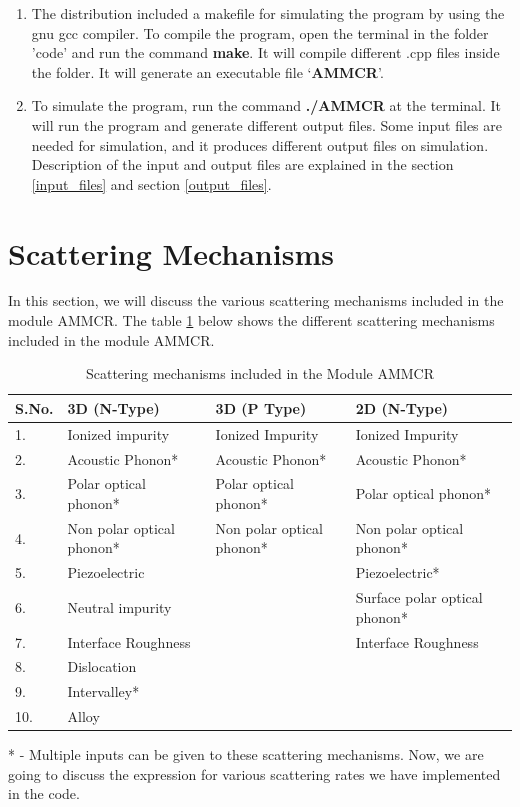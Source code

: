 \documentclass[12pt]{article}
\begin{document}
\begin{enumerate}
\item The distribution included a makefile for simulating the program by using the gnu gcc compiler.  To compile the program, open the terminal in the folder 'code' and run the command \textbf{make}. It will compile different .cpp files inside the folder. It will generate an executable file \lq \textbf{AMMCR}\rq .

\item To simulate the program, run the command \textbf{./AMMCR} at the terminal. It will run the program and generate different output files. Some input files are needed for simulation, and it produces different output files on simulation. Description of the input and output files are explained in the section \ref{input_files} and section \ref{output_files}. 

\end{enumerate} 


\section{Scattering Mechanisms} \label{scattering}
In this section, we will discuss the various scattering mechanisms included in the module AMMCR. 
The table \ref{scattering} below shows the different scattering mechanisms included in the module AMMCR.

\begin{table} [H]
\caption{ Scattering mechanisms included in the Module AMMCR}
\label{scattering_table}
\begin{tabular}{|l|l|l|l|}
\hline
S.No. & 3D (N-Type) & 3D (P Type) & 2D (N-Type)   \\
\hline                                      
1. & Ionized impurity   &  Ionized Impurity & Ionized Impurity \\
\hline
2. & Acoustic Phonon*   &  Acoustic Phonon* &  Acoustic Phonon*  \\
\hline
3. & Polar optical phonon*    &  Polar optical phonon* &  Polar optical phonon* \\
\hline
4. & Non polar optical phonon*   &  Non polar optical phonon*  &  Non polar optical phonon* \\
\hline
5. & Piezoelectric & & Piezoelectric* \\
\hline
6. & Neutral impurity & & Surface polar optical phonon* \\
\hline
7. & Interface Roughness & & Interface Roughness \\
\hline
8. & Dislocation & & \\
\hline
9. & Intervalley* & & \\
\hline
10. & Alloy & & \\
\hline
\end{tabular}
\end{table}
* - Multiple inputs can be given to these scattering mechanisms.
Now, we are going to discuss the expression for various scattering rates we have implemented in the code.
\end{document}
